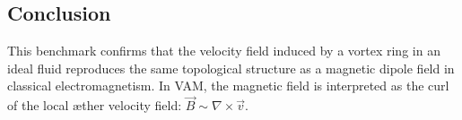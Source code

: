 \subsection{Conclusion}

This benchmark confirms that the velocity field induced by a vortex ring in an ideal fluid reproduces the same topological structure as a magnetic dipole field in classical electromagnetism. In VAM, the magnetic field is interpreted as the curl of the local æther velocity field: $\vec{B} \sim \nabla \times \vec{v}$.

